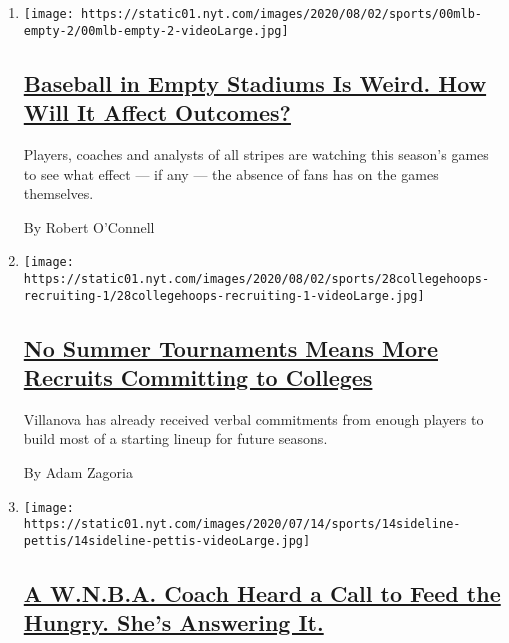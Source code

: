 \begin{enumerate}
\def\labelenumi{\arabic{enumi}.}
\item
  \texttt{[image: https://static01.nyt.com/images/2020/08/02/sports/00mlb-empty-2/00mlb-empty-2-videoLarge.jpg]}

  \hypertarget{baseball-in-empty-stadiums-is-weird-how-will-it-affect-outcomes}{%
  \subsection{\texorpdfstring{\href{/2020/07/31/sports/baseball/baseball-empty-stadiums-effects.html}{Baseball
  in Empty Stadiums Is Weird. How Will It Affect
  Outcomes?}}{Baseball in Empty Stadiums Is Weird. How Will It Affect Outcomes?}}\label{baseball-in-empty-stadiums-is-weird-how-will-it-affect-outcomes}}

  Players, coaches and analysts of all stripes are watching this
  season's games to see what effect --- if any --- the absence of fans
  has on the games themselves.

  By Robert O'Connell
\item
  \texttt{[image: https://static01.nyt.com/images/2020/08/02/sports/28collegehoops-recruiting-1/28collegehoops-recruiting-1-videoLarge.jpg]}

  \hypertarget{no-summer-tournaments-means-more-recruits-committing-to-colleges}{%
  \subsection{\texorpdfstring{\href{/2020/07/30/sports/ncaabasketball/college-basketball-recruiting.html}{No
  Summer Tournaments Means More Recruits Committing to
  Colleges}}{No Summer Tournaments Means More Recruits Committing to Colleges}}\label{no-summer-tournaments-means-more-recruits-committing-to-colleges}}

  Villanova has already received verbal commitments from enough players
  to build most of a starting lineup for future seasons.

  By Adam Zagoria
\item
  \texttt{[image: https://static01.nyt.com/images/2020/07/14/sports/14sideline-pettis/14sideline-pettis-videoLarge.jpg]}

  \hypertarget{a-wnba-coach-heard-a-call-to-feed-the-hungry-shes-answering-it}{%
  \subsection{\texorpdfstring{\href{/2020/07/30/sports/basketball/wnba-bridget-pettis.html}{A
  W.N.B.A. Coach Heard a Call to Feed the Hungry. She's Answering
  It.}}{A W.N.B.A. Coach Heard a Call to Feed the Hungry. She's Answering It.}}\label{a-wnba-coach-heard-a-call-to-feed-the-hungry-shes-answering-it}}


\end{enumerate}
